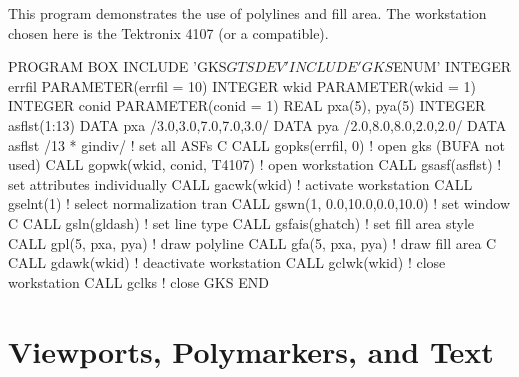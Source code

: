 This program demonstrates the use of polylines and fill area.
The workstation chosen here is the Tektronix 4107 (or a compatible).
\begin{XMP}
      PROGRAM   BOX
      INCLUDE  'GKS$GTSDEV'
      INCLUDE  'GKS$ENUM'
      INTEGER   errfil
      PARAMETER(errfil = 10)
      INTEGER   wkid
      PARAMETER(wkid   = 1)
      INTEGER   conid
      PARAMETER(conid  = 1)
      REAL      pxa(5), pya(5)
      INTEGER   asflst(1:13)
      DATA      pxa /3.0,3.0,7.0,7.0,3.0/
      DATA      pya /2.0,8.0,8.0,2.0,2.0/
      DATA      asflst /13 * gindiv/  ! set all ASFs
C
      CALL gopks(errfil, 0)           ! open gks (BUFA not used)
      CALL gopwk(wkid, conid, T4107)  ! open workstation
      CALL gsasf(asflst)              ! set attributes individually
      CALL gacwk(wkid)                ! activate workstation
      CALL gselnt(1)                  ! select normalization tran
      CALL gswn(1, 0.0,10.0,0.0,10.0) ! set window
C
      CALL gsln(gldash)               ! set line type
      CALL gsfais(ghatch)             ! set fill area style
      CALL gpl(5, pxa, pya)           ! draw polyline
      CALL gfa(5, pxa, pya)           ! draw fill area
C
      CALL gdawk(wkid)                ! deactivate workstation
      CALL gclwk(wkid)                ! close workstation
      CALL gclks                      ! close GKS
      END
\end{XMP}
\section{Viewports, Polymarkers, and Text}
 
